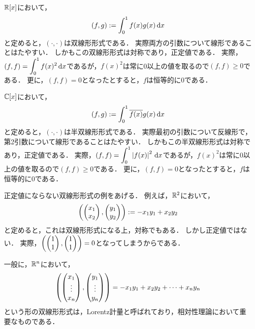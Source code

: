 \begin{example}
$\RR[x]$において，
\[
  (f,g) := \int_{0}^{1} f(x) g(x) \id x
\]
と定めると，$(\cdot,\cdot)$は双線形形式である．
実際両方の引数について線形であることはたやすい．
しかもこの双線形形式は対称であり，正定値である．
実際，$\displaystyle (f,f) = \int_0^1 f(x)^2 \id x$であるが，$f(x)^2$は常に0以上の値を取るので$(f,f) \ge 0$である．
更に，$(f,f)=0$となったとすると，$f$は恒等的に0である．
\end{example}
\begin{example}
  $\CC[x]$において，
  \[
    (f,g) := \int_{0}^{1} \conj{f(x)} g(x) \id x
  \]
  と定めると，$(\cdot,\cdot)$は半双線形形式である．
  実際最初の引数について反線形で，第2引数について線形であることはたやすい．
  しかもこの半双線形形式は対称であり，正定値である．
  実際，$\displaystyle (f,f) = \int_0^1 \abs{f(x)}^2 \id x$であるが，$f(x)^2$は常に0以上の値を取るので$(f,f) \ge 0$である．
  更に，$(f,f)=0$となったとすると，$f$は恒等的に0である．
\end{example}
\begin{example}
正定値にならない双線形形式の例をあげる．
例えば，$\RR^2$において，
\[
  \left( \pmt{x_1 \\ x_2 },\pmt{y_1 \\ y_2} \right)
  := - x_1 y_1 + x_2 y_2
\]
と定めると，これは双線形形式になる上，対称でもある．
しかし正定値ではない．
実際，$\left( \pmt{1 \\ 1}, \pmt{1 \\ 1} \right) = 0$となってしまうからである．
\end{example}
\begin{remark}
一般に，$\RR^n$において，
\[
  \left( \idxvec{x}{1}{n}, \idxvec{y}{1}{n} \right)
  = -x_1 y_1 + \lncmb{x}{y}{2}{n}{+}
\]
という形の双線形形式は，Lorentz計量と呼ばれており，相対性理論において重要なものである．
\end{remark}
